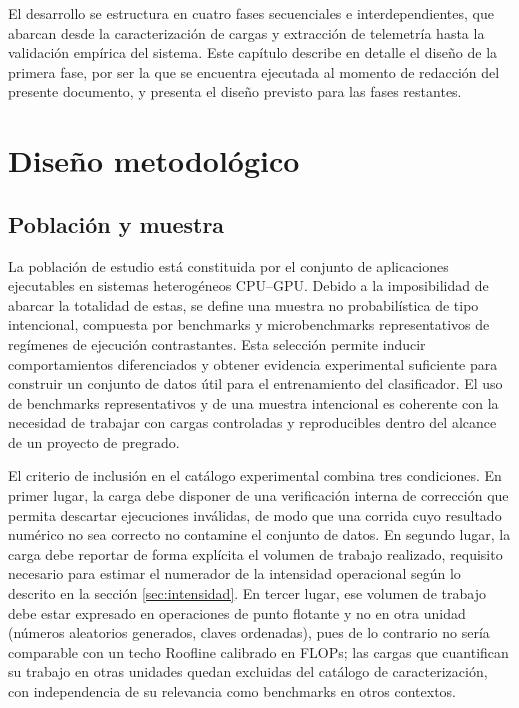 \documentclass[12pt,oneside,spanish]{book}
\begin{document}
El desarrollo se estructura en cuatro fases secuenciales e interdependientes, que abarcan desde la caracterización de cargas y extracción de telemetría hasta la validación empírica del sistema. Este capítulo describe en detalle el diseño de la primera fase, por ser la que se encuentra ejecutada al momento de redacción del presente documento, y presenta el diseño previsto para las fases restantes.

\section{Diseño metodológico}

\subsection{Población y muestra}

La población de estudio está constituida por el conjunto de aplicaciones ejecutables en sistemas heterogéneos CPU--GPU. Debido a la imposibilidad de abarcar la totalidad de estas, se define una muestra no probabilística de tipo intencional, compuesta por benchmarks y microbenchmarks representativos de regímenes de ejecución contrastantes. Esta selección permite inducir comportamientos diferenciados y obtener evidencia experimental suficiente para construir un conjunto de datos útil para el entrenamiento del clasificador. El uso de benchmarks representativos y de una muestra intencional es coherente con la necesidad de trabajar con cargas controladas y reproducibles dentro del alcance de un proyecto de pregrado.

\label{sec:unidades}
El criterio de inclusión en el catálogo experimental combina tres condiciones. En primer lugar, la carga debe disponer de una verificación interna de corrección que permita descartar ejecuciones inválidas, de modo que una corrida cuyo resultado numérico no sea correcto no contamine el conjunto de datos. En segundo lugar, la carga debe reportar de forma explícita el volumen de trabajo realizado, requisito necesario para estimar el numerador de la intensidad operacional según lo descrito en la sección \ref{sec:intensidad}. En tercer lugar, ese volumen de trabajo debe estar expresado en operaciones de punto flotante y no en otra unidad (números aleatorios generados, claves ordenadas), pues de lo contrario no sería comparable con un techo Roofline calibrado en FLOPs; las cargas que cuantifican su trabajo en otras unidades quedan excluidas del catálogo de caracterización, con independencia de su relevancia como benchmarks en otros contextos.
\end{document}
